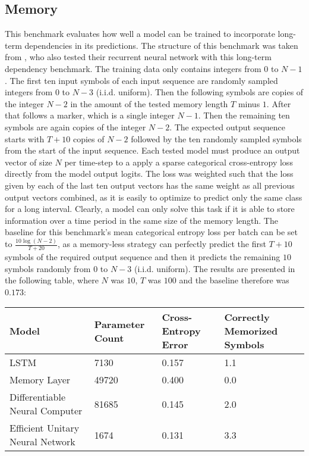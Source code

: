 \documentclass[draft,final]{vutinfth} %
\begin{document}
\subsection{Memory}
This benchmark evaluates how well a model can be trained to incorporate long-term dependencies in its predictions.
The structure of this benchmark was taken from \cite{UnitaryRNNs}, who also tested their recurrent neural network with this long-term dependency benchmark.
The training data only contains integers from $0$ to $N-1$. The first ten input symbols of each input sequence are randomly sampled integers from $0$ to $N-3$ (i.i.d. uniform). 
Then the following symbols are copies of the integer $N-2$ in the amount of the tested memory length $T$ minus $1$. 
After that follows a marker, which is a single integer $N-1$. 
Then the remaining ten symbols are again copies of the integer $N-2$. 
The expected output sequence starts with $T+10$ copies of $N-2$ followed by the ten randomly sampled symbols from the start of the input sequence.
Each tested model must produce an output vector of size $N$ per time-step to a apply a sparse categorical cross-entropy loss directly from the model output logits.
The loss was weighted such that the loss given by each of the last ten output vectors has the same weight as all previous output vectors combined, as it is easily to optimize to predict only the same class for a long interval.
Clearly, a model can only solve this task if it is able to store information over a time period in the same size of the memory length.
The baseline for this benchmark's mean categorical entropy loss per batch can be set to $\frac{10\log(N-2)}{T+20}$, as a memory-less strategy can perfectly predict the first $T+10$ symbols of the required output sequence and then it predicts the remaining $10$ symbols randomly from $0$ to $N-3$ (i.i.d. uniform).
The results are presented in the following table, where $N$ was $10$, $T$ was $100$ and the baseline therefore was $0.173$:
\begin{table}[h]
\begin{tabular}{llll}
\hline
Model & Parameter Count & Cross-Entropy Error & Correctly Memorized Symbols \\ \hline
LSTM & 7130 & 0.157 & 1.1 \\ 
Memory Layer & 49720 & 0.400 & 0.0 \\
Differentiable Neural Computer & 81685 & 0.145 & 2.0 \\
Efficient Unitary Neural Network & 1674 & 0.131 & 3.3 \\
\end{tabular}
\end{table}
\end{document}
